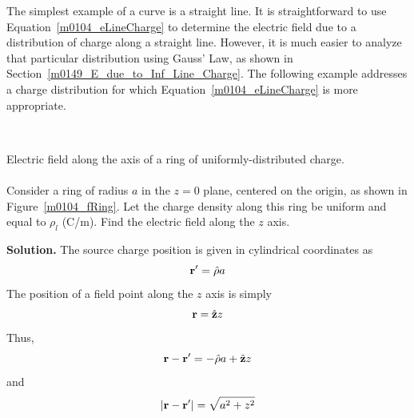 The simplest example of a curve is a straight line.
It is straightforward to use Equation~\ref{m0104_eLineCharge} to determine the electric field due to a distribution of charge along a straight line.
However, it is much easier to analyze that particular distribution using Gauss' Law, as shown in Section~\ref{m0149_E_due_to_Inf_Line_Charge}.
The following example addresses a charge distribution for which Equation~\ref{m0104_eLineCharge} is more appropriate.

~\\ \begin{example} 
\begin{mdframed}[backgroundcolor=brown!20,linecolor=brown!20]\raggedright
Electric field along the axis of a ring of uniformly-distributed charge.
\\~\\
Consider a ring of radius $a$ in the $z=0$ plane, centered on the origin, as shown in Figure~\ref{m0104_fRing}.
Let the charge density along this ring be uniform and equal to $\rho_l$ (C/m).
Find the electric field along the $z$ axis.

{\bf Solution.}
The source charge position is given in cylindrical coordinates as
%
\begin{equation}
{\bf r}' = \hat{\bf \rho}a  
\end{equation}
%
The position of a field point along the $z$ axis is simply
%
\begin{equation}
{\bf r} = \hat{\bf z}z  
\end{equation}
%
Thus,
%
\begin{equation}
{\bf r}-{\bf r}' = -\hat{\bf \rho}a + \hat{\bf z}z  
\end{equation}
%
and
%
\begin{equation}
\left|{\bf r}-{\bf r}'\right| = \sqrt{a^2+z^2} 
\end{equation}


\end{mdframed}
\end{example}
